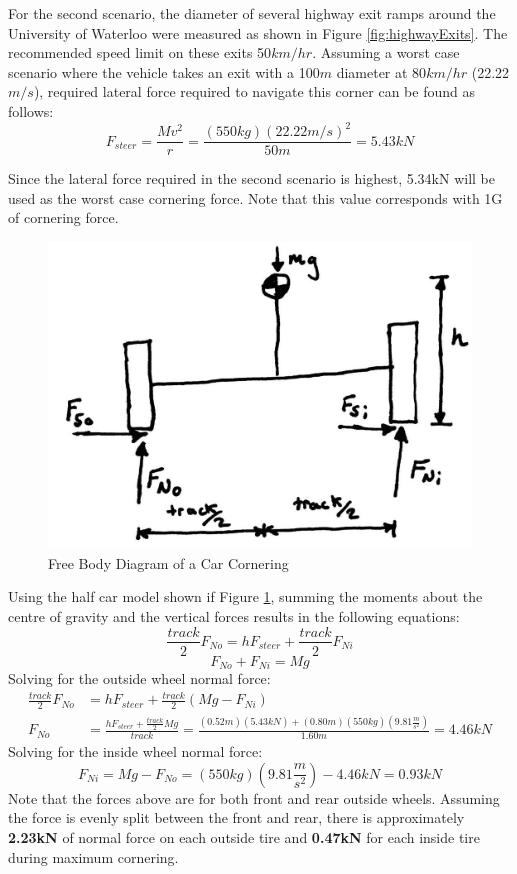 \documentclass[12pt]{article}
\begin{document}
For the second scenario, the diameter of several highway exit ramps around the University of Waterloo were measured as shown in Figure \ref{fig:highwayExits}. The recommended speed limit on these exits 50$km/hr$. Assuming a worst case scenario where the vehicle takes an exit with a 100$m$ diameter at 80$km/hr$ (22.22$m/s$), required lateral force required to navigate this corner can be found as follows: 
\begin{equation}
	F_{steer} = \frac{Mv^2}{r} = \frac{(550kg)(22.22m/s)^2}{50m} = 5.43kN
\end{equation}

Since the lateral force required in the second scenario is highest, 5.34kN will be used as the worst case cornering force. Note that this value corresponds with 1G of cornering force. 

\begin{figure}[h!]
	\centering
	\includegraphics[width=.5\textwidth]{./LaTex/steerFBD.jpg}
	\caption{Free Body Diagram of a Car Cornering}
	\label{fig:steerFBD}
\end{figure}

Using the half car model shown if Figure \ref{fig:steerFBD}, summing the moments about the centre of gravity and the vertical forces results in the following equations: 
\begin{equation}
	\frac{track}{2}F_{No} = hF_{steer} + \frac{track}{2}F_{Ni}
\end{equation}
\begin{equation}
	F_{No} + F_{Ni} = Mg
\end{equation}
Solving for the outside wheel normal force: 
\begin{equation}
\begin{split}
	\frac{track}{2}F_{No} &= hF_{steer} + \frac{track}{2}(Mg - F_{Ni})\\
	F_{No} &= \frac{hF_{steer} + \frac{track}{2}Mg}{track} = \frac{(0.52m)(5.43kN)+(0.80m)(550kg)\left(9.81\frac{m}{s^2}\right)}{1.60m} = 4.46kN
\end{split}
\end{equation}
Solving for the inside wheel normal force: 
\begin{equation}
	F_{Ni} = Mg - F_{No} = (550kg)\left(9.81\frac{m}{s^2}\right) - 4.46kN = 0.93kN
\end{equation}
Note that the forces above are for both front and rear outside wheels. Assuming the force is evenly split between the front and rear, there is approximately \textbf{2.23kN} of normal force on each outside tire and \textbf{0.47kN} for each inside tire during maximum cornering.
 
\end{document}
